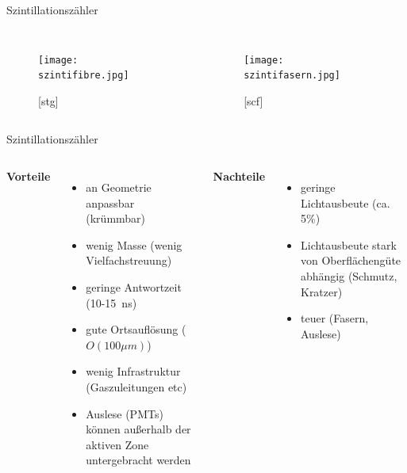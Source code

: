 \begin{frame}{Szintillationszähler}
		\begin{columns}[T]
			\begin{figure}[htbp]
			  \centering
			  \texttt{[image: szintifibre.jpg]}
			  \caption*{[stg]}
			\end{figure}
	    	\begin{figure}[htbp]
			  \centering
			  \texttt{[image: szintifasern.jpg]}
			  \caption*{[scf]}
			\end{figure}
    \end{columns}
\end{frame}
	
	\begin{frame}{Szintillationszähler}
    \begin{columns}[T]
			\textbf{Vorteile}		
			\vspace{0.7cm}
			\begin{itemize}
			  \item an Geometrie anpassbar (krümmbar)
			  \item wenig Masse (wenig Vielfachstreuung)
			  \item geringe Antwortzeit (10-15~ns)
			  \item gute Ortsauflösung ($O(100\mu m)$)
			  \item wenig Infrastruktur (Gaszuleitungen etc)
			  \item Auslese (PMTs) können außerhalb der aktiven Zone untergebracht werden
			\end{itemize}	
	    	\textbf{Nachteile}
	    	\vspace{0.7cm}
	    	\begin{itemize}
			  \item geringe Lichtausbeute (ca. 5\%)
			  \item Lichtausbeute stark von Oberflächengüte abhängig (Schmutz, Kratzer)
			  \item teuer (Fasern, Auslese)
			\end{itemize}
    \end{columns}
\end{frame}

